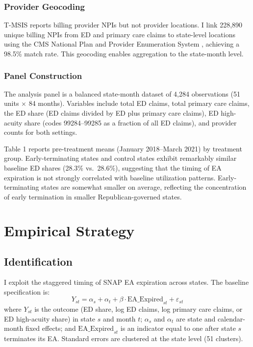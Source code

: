 \documentclass[12pt]{article}
\begin{document}
\subsubsection*{Provider Geocoding} T-MSIS reports billing provider NPIs but not provider locations. I link 228,890 unique billing NPIs from ED and primary care claims to state-level locations using the CMS National Plan and Provider Enumeration System \citep{cms_nppes}, achieving a 98.5\% match rate. This geocoding enables aggregation to the state-month level.

\subsubsection*{Panel Construction} The analysis panel is a balanced state-month dataset of 4,284 observations (51 units $\times$ 84 months). Variables include total ED claims, total primary care claims, the ED share (ED claims divided by ED plus primary care claims), ED high-acuity share (codes 99284--99285 as a fraction of all ED claims), and provider counts for both settings.



Table 1 reports pre-treatment means (January 2018--March 2021) by treatment group. Early-terminating states and control states exhibit remarkably similar baseline ED shares (28.3\% vs.\ 28.6\%), suggesting that the timing of EA expiration is not strongly correlated with baseline utilization patterns. Early-terminating states are somewhat smaller on average, reflecting the concentration of early termination in smaller Republican-governed states.

\section{Empirical Strategy}

\subsection{Identification}

I exploit the staggered timing of SNAP EA expiration across states. The baseline specification is:
\begin{equation}
Y_{st} = \alpha_s + \alpha_t + \beta \cdot \text{EA\_Expired}_{st} + \varepsilon_{st}
\label{eq:twfe}
\end{equation}
where $Y_{st}$ is the outcome (ED share, log ED claims, log primary care claims, or ED high-acuity share) in state $s$ and month $t$; $\alpha_s$ and $\alpha_t$ are state and calendar-month fixed effects; and $\text{EA\_Expired}_{st}$ is an indicator equal to one after state $s$ terminates its EA. Standard errors are clustered at the state level (51 clusters).
\end{document}
